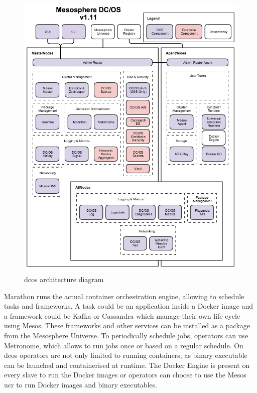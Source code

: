 \begin{figure}
    \centering
    \includegraphics[width=1\columnwidth]{images/dcos-arch}
    \caption{\gls{dcos} architecture diagram\cite{dcos_arch}}
    \label{fig:dcos-arch}
\end{figure}

Marathon\cite{marathon} runs the actual container orchestration engine, allowing to schedule tasks and frameworks. A task could be an application inside a Docker image and a framework could be Kafka\cite{kafka} or Cassandra\cite{cassandra} which manage their own life cycle using Mesos. These frameworks and other services can be installed as a package from the Mesosphere Universe\cite{universe}. To periodically schedule jobs, operators can use Metronome\cite{metronome}, which allows to run jobs once or based on a regular schedule. On \gls{dcos} operators are not only limited to running containers, as binary executable can be launched and containerised at runtime. The Docker Engine is present on every slave to run the Docker images or operators can choose to use the Mesos \gls{ucr}\cite{ucr} to run Docker images and binary executables.

